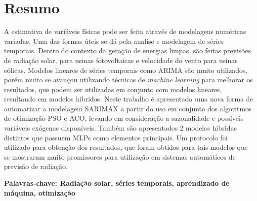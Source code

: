 \chapter*{Resumo}

A estimativa de variáveis físicas pode ser feita através de modelagens numéricas variadas. Uma das formas úteis se dá pela analise e modelagem de séries temporais. Dentro do contexto da geração de energias limpas, são feitas previsões de radiação solar, para usinas fotovoltaicas e velocidade do vento para usinas eólicas. Modelos lineares de séries temporais como ARIMA são muito utilizados, porém muito se avançou utilizando técnicas de \textit{machine learning} para melhorar os resultados, que podem ser utilizadas em conjunto com modelos lineares, resultando em modelos híbridos. Neste trabalho é apresentada uma nova forma de automatizar a modelagem SARIMAX a partir do uso em conjunto dos algoritmos de otimização PSO e ACO, levando em consideração a sazonalidade e possíveis variáveis exógenas disponíveis. Também são apresentados 2 modelos híbridas distintos que possuem MLPs como elementos principais. Um protocolo foi utilizado para obtenção dos resultados, que foram obtidos para tais modelos que se mostraram muito promissores para utilização em sistemas automáticos de previsão de radiação.


\noindent\par\vspace{1em}
\noindent\textbf{Palavras-chave: Radiação solar, séries temporais, aprendizado de máquina, otimização} 